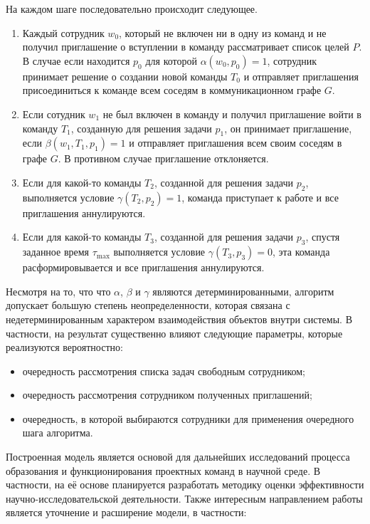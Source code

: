 На каждом шаге последовательно происходит следующее.
\begin{enumerate}
\item 
Каждый сотрудник $w_0$, который не включен ни в одну из команд и не получил приглашение о вступлении в команду рассматривает список целей $P$. В случае если находится $p_0$ для которой $\alpha(w_0,p_0)=1$, сотрудник принимает решение о создании новой команды $T_0$ и отправляет приглашения присоединиться к команде всем соседям в коммуникационном графе $G$.

\item Если сотудник $w_1$ не был включен в команду и получил приглашение войти в команду $T_1$, созданную для решения задачи $p_1$, он принимает приглашение, если $\beta(w_1,T_1,p_1) = 1$ и отправляет приглашения всем своим соседям в графе $G$. В противном случае приглашение отклоняется.

\item Если для какой-то команды $T_2$, созданной для решения задачи $p_2$, выполняется условие $\gamma(T_2,p_2)=1$, команда приступает к работе и все приглашения аннулируются.

\item Если для какой-то команды $T_3$, созданной для решения задачи $p_3$, спустя заданное время $\tau_{\max}$ выполняется условие $\gamma(T_3,p_3)=0$, эта команда расформировывается и все приглашения аннулируются.

\end{enumerate}

Несмотря на то, что что $\alpha$, $\beta$ и $\gamma$ являются детерминированными, алгоритм допускает большую степень неопределенности, которая связана с недетерминированным характером взаимодействия объектов внутри системы. 
В частности, на результат существенно влияют следующие параметры, которые реализуются вероятностно:
\begin{itemize}
\item очередность рассмотрения списка задач свободным сотрудником;
\item очередность рассмотрения сотрудником полученных приглашений;
\item очередность, в которой выбираются сотрудники для применения очередного шага алгоритма. 
\end{itemize}

Построенная модель является основой для дальнейших исследований процесса образования и функционирования проектных команд в научной среде. 
В частности, на её основе планируется разработать методику оценки эффективности научно-исследовательской деятельности.
Также интересным направлением работы является уточнение и расширение модели, в частности:

